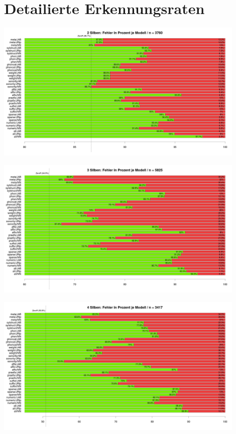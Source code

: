 
\clearpage

\clearpage


\section{Detailierte Erkennungsraten}
\label{performance_details}
\begin{center}{\includegraphics[width=12cm]{figures/basicstats/2syl-basicstats.png}}\end{center}
\begin{center}{\includegraphics[width=12cm]{figures/basicstats/3syl-basicstats.png}}\end{center}
\begin{center}{\includegraphics[width=12cm]{figures/basicstats/4syl-basicstats.png}}\end{center}
